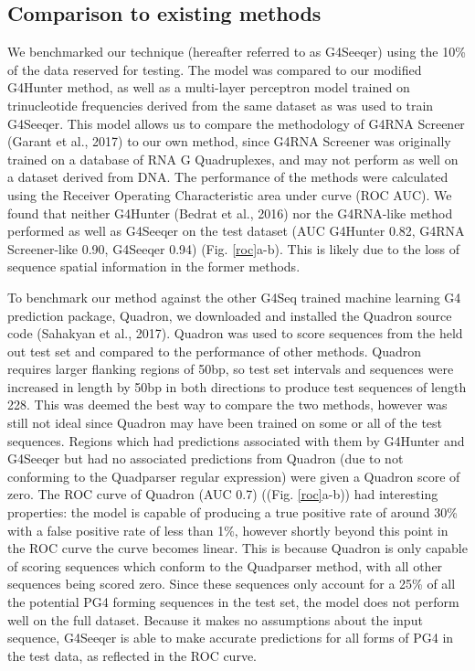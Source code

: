 \documentclass[12pt,a4paper,]{report}
\begin{document}
\newpage

\hypertarget{comparison-to-existing-methods}{%
\subsection{Comparison to existing
methods}\label{comparison-to-existing-methods}}

We benchmarked our technique (hereafter referred to as G4Seeqer) using
the 10\% of the data reserved for testing. The model was compared to our
modified G4Hunter method, as well as a multi-layer perceptron model
trained on trinucleotide frequencies derived from the same dataset as
was used to train G4Seeqer. This model allows us to compare the
methodology of G4RNA Screener (Garant et al., 2017) to our own method,
since G4RNA Screener was originally trained on a database of RNA G
Quadruplexes, and may not perform as well on a dataset derived from DNA.
The performance of the methods were calculated using the Receiver
Operating Characteristic area under curve (ROC AUC). We found that
neither G4Hunter (Bedrat et al., 2016) nor the G4RNA-like method
performed as well as G4Seeqer on the test dataset (AUC G4Hunter 0.82,
G4RNA Screener-like 0.90, G4Seeqer 0.94) (Fig. \ref{roc}a-b). This is
likely due to the loss of sequence spatial information in the former
methods.

To benchmark our method against the other G4Seq trained machine learning
G4 prediction package, Quadron, we downloaded and installed the Quadron
source code (Sahakyan et al., 2017). Quadron was used to score sequences
from the held out test set and compared to the performance of other
methods. Quadron requires larger flanking regions of 50bp, so test set
intervals and sequences were increased in length by 50bp in both
directions to produce test sequences of length 228. This was deemed the
best way to compare the two methods, however was still not ideal since
Quadron may have been trained on some or all of the test sequences.
Regions which had predictions associated with them by G4Hunter and
G4Seeqer but had no associated predictions from Quadron (due to not
conforming to the Quadparser regular expression) were given a Quadron
score of zero. The ROC curve of Quadron (AUC 0.7) ((Fig. \ref{roc}a-b))
had interesting properties: the model is capable of producing a true
positive rate of around 30\% with a false positive rate of less than
1\%, however shortly beyond this point in the ROC curve the curve
becomes linear. This is because Quadron is only capable of scoring
sequences which conform to the Quadparser method, with all other
sequences being scored zero. Since these sequences only account for a
25\% of all the potential PG4 forming sequences in the test set, the
model does not perform well on the full dataset. Because it makes no
assumptions about the input sequence, G4Seeqer is able to make accurate
predictions for all forms of PG4 in the test data, as reflected in the
ROC curve.
\end{document}
